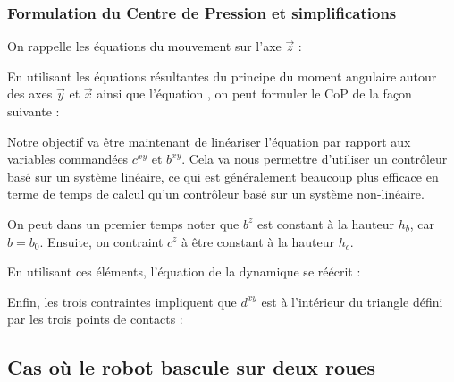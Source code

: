 			\subsubsection{Formulation du Centre de Pression et simplifications}
			
				On rappelle les équations du mouvement sur l'axe $\vec{z}$  :
			
				En utilisant les équations résultantes du principe du moment angulaire autour des axes $\vec{y}$ et $\vec{x}$  ainsi que l'équation , on peut formuler le CoP de la façon suivante :	
				
				Notre objectif va être maintenant de linéariser l'équation  par rapport aux variables commandées $c^{xy}$ et $b^{xy}$.
				Cela va nous permettre d'utiliser un contrôleur basé sur un système linéaire, ce qui est généralement beaucoup plus efficace en terme de temps de calcul qu'un contrôleur basé sur un système non-linéaire.
				
				On peut dans un premier temps noter que $b^z$ est constant à la hauteur $h_b$, car $b=b_0$. Ensuite, on contraint $c^z$ à être constant à la hauteur $h_c$.
				
				En utilisant ces éléments, l'équation de la dynamique  se réécrit :
				
				
				Enfin, les trois contraintes  impliquent que $d^{xy}$ est à l'intérieur du triangle défini par les trois points de contacts :
				

			
			
		\subsection{Cas où le robot bascule sur deux roues}

